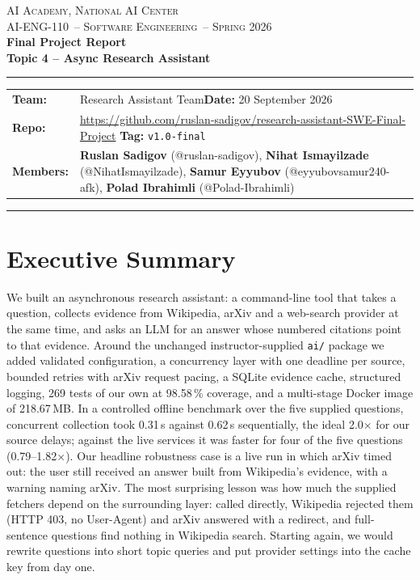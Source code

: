 \documentclass[11pt,a4paper]{article}
\newcommand{\teamname}{Research Assistant Team}
\newcommand{\topicchoice}{Topic 4 -- Async Research Assistant}
\newcommand{\member}[2]{\textbf{#1} (#2)}  %
\newcommand{\reportdate}{20 September 2026}
\newcommand{\repolink}{\url{https://github.com/ruslan-sadigov/research-assistant-SWE-Final-Project}}
\newcommand{\coursecode}{AI-ENG-110}
\newcommand{\coursename}{Software Engineering}
\newcommand{\institution}{AI Academy, National AI Center}
\newcommand{\semester}{Spring 2026}
\newcommand{\owntests}{269}
\newcommand{\coveragepct}{98.58}
\newcommand{\imagesize}{218.67\,MB}
\begin{document}
\begin{center}
{\small \textsc{\institution} \\[0.2em] \textsc{\coursecode\ -- \coursename\ -- \semester}}\\[1.2em]
{\Large\bfseries\color{accent} Final Project Report}\\[0.3em]
{\LARGE\bfseries \topicchoice}\\[0.6em]
\rule{0.85\textwidth}{0.6pt}
\end{center}

\vspace{0.6em}
\begin{tabularx}{\textwidth}{@{}lX@{}}
\textbf{Team:} & \teamname \hfill \textbf{Date:} \reportdate \\
\textbf{Repo:} & {\small\repolink} \hfill \textbf{Tag:} \texttt{v1.0-final} \\
\textbf{Members:} & \member{Ruslan Sadigov}{@ruslan-sadigov},\quad
  \member{Nihat Ismayilzade}{@NihatIsmayilzade},\newline
  \member{Samur Eyyubov}{@eyyubovsamur240-afk},\quad
  \member{Polad Ibrahimli}{@Polad-Ibrahimli} \\
\end{tabularx}
\vspace{0.4em}\hrule\vspace{0.6em}

\section*{Executive Summary}

We built an asynchronous research assistant: a command-line tool that takes a
question, collects evidence from Wikipedia, arXiv and a web-search provider at
the same time, and asks an LLM for an answer whose numbered citations point to
that evidence. Around the unchanged instructor-supplied \texttt{ai/} package we
added validated configuration, a concurrency layer with one deadline per source,
bounded retries with arXiv request pacing, a SQLite evidence cache, structured
logging, \owntests{} tests of our own at \coveragepct\,\% coverage, and a
multi-stage Docker image of \imagesize{}. In a controlled offline benchmark over
the five supplied questions, concurrent collection took 0.31\,s against 0.62\,s
sequentially, the ideal 2.0$\times$ for our source delays; against the live
services it was faster for four of the five questions (0.79--1.82$\times$). Our
headline robustness case is a live run in which arXiv timed out: the user still
received an answer built from Wikipedia's evidence, with a warning naming arXiv.
The most surprising lesson was how much the supplied fetchers depend on the
surrounding layer: called directly, Wikipedia rejected them (HTTP 403, no
User-Agent) and arXiv answered with a redirect, and full-sentence questions find
nothing in Wikipedia search. Starting again, we would rewrite questions into
short topic queries and put provider settings into the cache key from day one.
\end{document}
